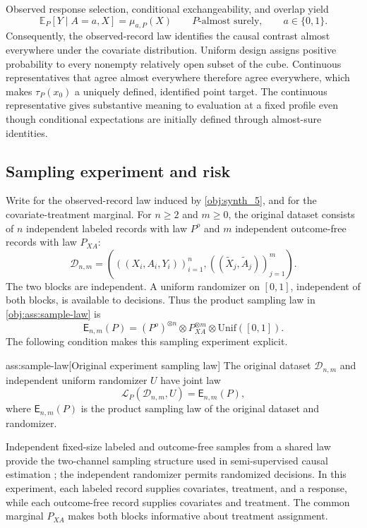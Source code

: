 \documentclass[11pt]{article}
\begin{document}
Observed response selection, conditional exchangeability, and overlap yield
\[
\mathbb E_P[Y\mid A=a,X]=\mu_{a,P}(X)
\qquad P\text{-almost surely},\qquad a\in\{0,1\}.
\]
Consequently, the observed-record law identifies the causal contrast almost everywhere under the covariate distribution. Uniform design assigns positive probability to every nonempty relatively open subset of the cube. Continuous representatives that agree almost everywhere therefore agree everywhere, which makes \(\tau_P(x_0)\) a uniquely defined, identified point target. The continuous representative gives substantive meaning to evaluation at a fixed profile even though conditional expectations are initially defined through almost-sure identities.

\subsection{Sampling experiment and risk}

Write  for the observed-record law induced by \cref{obj:synth_5}, and  for the covariate-treatment marginal. For \(n\ge2\) and \(m\ge0\), the original dataset  consists of \(n\) independent labeled records with law \(P^o\) and \(m\) independent outcome-free records with law \(P_{XA}\):
\[
\mathcal D_{n,m}
=
\left(
((X_i,A_i,Y_i))_{i=1}^{n},
((\widetilde X_j,\widetilde A_j))_{j=1}^{m}
\right).
\]
The two blocks are independent. A uniform randomizer  on \([0,1]\), independent of both blocks, is available to decisions. Thus the product sampling law  in \cref{obj:ass:sample-law} is
\[
\mathsf E_{n,m}(P)
=
(P^o)^{\otimes n}
\otimes P_{XA}^{\otimes m}
\otimes\mathrm{Unif}([0,1]).
\]
The following condition makes this sampling experiment explicit.

\begin{assumptionv}{ass:sample-law}[Original experiment sampling law]
The original dataset \(\mathcal D_{n,m}\) and independent uniform randomizer \(U\) have joint law
\[
\mathcal L_P(\mathcal D_{n,m},U)=\mathsf E_{n,m}(P),
\]
where \(\mathsf E_{n,m}(P)\) is the product sampling law of the original dataset and randomizer.
\end{assumptionv}

Independent fixed-size labeled and outcome-free samples from a shared law provide the two-channel sampling structure used in semi-supervised causal estimation \citep{ChakraborttyDai2022}; the independent randomizer permits randomized decisions. In this experiment, each labeled record supplies covariates, treatment, and a response, while each outcome-free record supplies covariates and treatment. The common marginal \(P_{XA}\) makes both blocks informative about treatment assignment.
\end{document}
